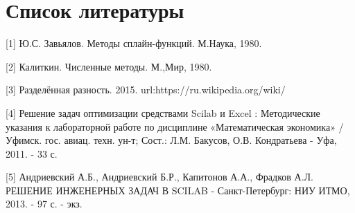 \documentclass[russian,utf8,nocolumnxxxi,nocolumnxxxii]{eskdtext}
\begin{document}
\section{Список литературы}
[1] Ю.С. Завьялов. Методы сплайн-функций. М.Наука, 1980.

[2] Калиткин. Численные методы. М.,Мир, 1980.

[3] Разделённая разность. 2015. url:https://ru.wikipedia.org/wiki/%

[4] Решение задач оптимизации средствами Scilab и Excel : Методические указания к лабораторной работе по дисциплине «Математическая экономика» / Уфимск. гос. авиац. техн. ун-т; Сост.: Л.М. Бакусов, О.В. Кондратьева - Уфа, 2011. - 33 с.

[5] Андриевский А.Б., Андриевский Б.Р., Капитонов А.А., Фрадков А.Л. РЕШЕНИЕ ИНЖЕНЕРНЫХ ЗАДАЧ В SCILAB - Санкт-Петербург: НИУ ИТМО, 2013. - 97 с. - экз.
\end{document}
